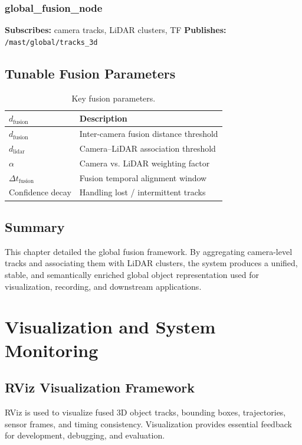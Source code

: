 \documentclass[12pt,a4paper]{report}
\begin{document}
\subsection{global\_fusion\_node}
\textbf{Subscribes:} camera tracks, LiDAR clusters, TF 
\textbf{Publishes:} \texttt{/mast/global/tracks\_3d}

\section{Tunable Fusion Parameters}
\begin{table}[H]
\centering
\caption{Key fusion parameters.}
\label{tab:fusion-params}
\begin{tabularx}{\textwidth}{@{}l X@{}}
\toprule
$d_{\text{fusion}}$ & Description \\
\midrule
$d_{\text{fusion}}$ & Inter-camera fusion distance threshold \\
$d_{\text{lidar}}$ & Camera--LiDAR association threshold \\
$\alpha$ & Camera vs. LiDAR weighting factor \\
$\Delta t_{\text{fusion}}$ & Fusion temporal alignment window \\
Confidence decay & Handling lost / intermittent tracks \\
\bottomrule
\end{tabularx}
\end{table}

\section{Summary}
This chapter detailed the global fusion framework. By aggregating camera-level tracks and associating them with LiDAR clusters, the system produces a unified, stable, and semantically enriched global object representation used for visualization, recording, and downstream applications.

\chapter{Visualization and System Monitoring}

\section{RViz Visualization Framework}
RViz is used to visualize fused 3D object tracks, bounding boxes, trajectories, sensor frames, and timing consistency. Visualization provides essential feedback for development, debugging, and evaluation.
\end{document}
